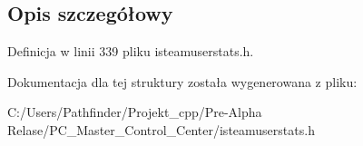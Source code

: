 \subsection{Opis szczegółowy}


Definicja w linii 339 pliku isteamuserstats.\+h.



Dokumentacja dla tej struktury została wygenerowana z pliku\+:\begin{DoxyCompactItemize}
\item 
C\+:/\+Users/\+Pathfinder/\+Projekt\+\_\+cpp/\+Pre-\/\+Alpha Relase/\+P\+C\+\_\+\+Master\+\_\+\+Control\+\_\+\+Center/isteamuserstats.\+h\end{DoxyCompactItemize}

